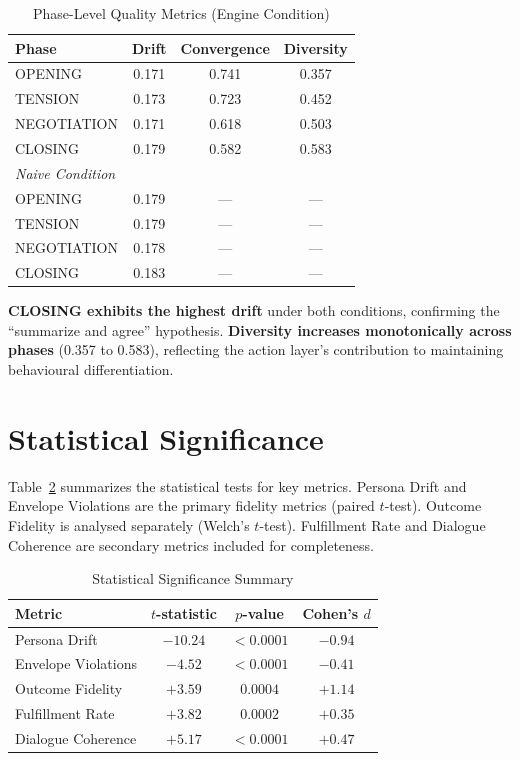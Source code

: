 \documentclass[12pt, a4paper]{report}
\begin{document}
\begin{table}[t]
\centering
\caption{Phase-Level Quality Metrics (Engine Condition)}
\label{tab:phase}
\begin{tabular}{lccc}
\toprule
Phase & Drift & Convergence & Diversity \\
\midrule
OPENING     & 0.171 & 0.741 & 0.357 \\
TENSION     & 0.173 & 0.723 & 0.452 \\
NEGOTIATION & 0.171 & 0.618 & 0.503 \\
CLOSING     & 0.179 & 0.582 & 0.583 \\
\midrule
\multicolumn{4}{l}{\textit{Naive Condition}} \\
OPENING     & 0.179 & --- & --- \\
TENSION     & 0.179 & --- & --- \\
NEGOTIATION & 0.178 & --- & --- \\
CLOSING     & 0.183 & --- & --- \\
\bottomrule
\end{tabular}
\end{table}

\textbf{CLOSING exhibits the highest drift} under both conditions, confirming the ``summarize and agree'' hypothesis. \textbf{Diversity increases monotonically across phases} (0.357 to 0.583), reflecting the action layer's contribution to maintaining behavioural differentiation.


\section{Statistical Significance}

Table~\ref{tab:significance} summarizes the statistical tests for key metrics. Persona Drift and Envelope Violations are the primary fidelity metrics (paired $t$-test). Outcome Fidelity is analysed separately (Welch's $t$-test). Fulfillment Rate and Dialogue Coherence are secondary metrics included for completeness.

\begin{table}[t]
\centering
\caption{Statistical Significance Summary}
\label{tab:significance}
\begin{tabular}{lccc}
\toprule
Metric & $t$-statistic & $p$-value & Cohen's $d$ \\
\midrule
Persona Drift        & $-10.24$ & $<0.0001$ & $-0.94$ \\
Envelope Violations  & $-4.52$  & $<0.0001$ & $-0.41$ \\
Outcome Fidelity     & $+3.59$  & $0.0004$  & $+1.14$ \\
Fulfillment Rate     & $+3.82$  & $0.0002$  & $+0.35$ \\
Dialogue Coherence   & $+5.17$  & $<0.0001$ & $+0.47$ \\
\bottomrule
\end{tabular}
\end{table}
\end{document}
